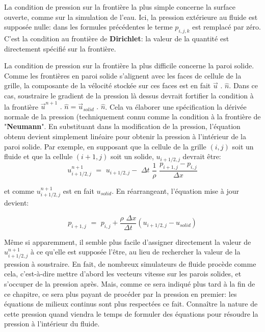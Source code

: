 \documentclass[11pt]{report}
\begin{document}
La condition de pression sur la frontière la plus simple concerne la surface ouverte, comme sur la simulation de l'eau. Ici, la pression extérieure au fluide est supposée nulle: dans les formules précédentes le terme $p_{i,j,k}$ est remplacé par zéro. C'est la condition au frontière de \textbf{Dirichlet}: la valeur de la quantité est directement spécifié sur la frontière. \newline

La condition de pression sur la frontière la plus difficile concerne la paroi solide. Comme les frontières en paroi solide s'alignent avec les faces de cellule de la grille, la composante de la vélocité stockée sur ces faces est en fait $\overrightarrow{u} \,\,.\,\, \hat{n}$. Dans ce cas, soustraire le gradient de la pression là dessus devrait fortifier la condition à la frontière $\overrightarrow{u}^{n+1} \,\, . \,\, \hat{n} = \overrightarrow{u}_{solid} \,\, . \,\, \hat{n}$. Cela va élaborer une spécification la dérivée normale de la pression (techniquement connu comme la condition à la frontière de "\textbf{Neumann}". En substituant dans la modification de la pression, l'équation obtenu devient simplement linéaire pour obtenir la pression à l'intérieur de la paroi solide. Par exemple, en supposant que la cellule de la grille $(i,j)$ soit un fluide et que la cellule $(i+1,j)$ soit un solide, $u_{i+1/2, j}$ devrait être:
\begin{equation}
u_{i+1/2,j}^{n+1} \,\, = \,\, u_{i+1/2,j} - \,\, \Delta t \,\, \frac{1}{\rho} \,\,\frac{p_{i+1,j} - p_{i,j}}{\Delta x}
\end{equation}

et comme $ u_{i+1/2,j}^{n+1} $ est en fait $ u_{solid} $. En réarrangeant, l'équation mise à jour devient:

\begin{equation}
p_{i+1,j} \,\, = \,\, p_{i,j} + \frac{\rho \,\, \Delta x}{\Delta t} (u_{i+1/2,j} - u_{solid})
\end{equation}

Même si apparemment, il semble plus facile d'assigner directement la valeur de $u_{i+1/2,j}^{n+1}$ à ce qu'elle est supposée l'être, au lieu de rechercher la valeur de la pression à soustraire. En fait, de nombreux simulateurs de fluide procède comme cela, c'est-à-dire mettre d'abord  les vecteurs vitesse sur les parois solides, et s'occuper de la pression après. Mais, comme ce sera indiqué plus tard à la fin de ce chapitre, ce sera plus payant de procéder par la pression en premier: les équations de milieux continus sont plus respectées ce fait. Connaître la nature de cette pression quand viendra le temps de formuler des équations pour résoudre la pression à l'intérieur du fluide.\newline
\end{document}
